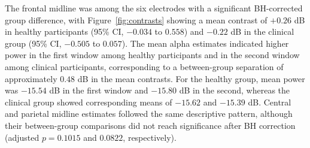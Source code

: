 \documentclass[11pt,letterpaper]{article}
\begin{document}
The frontal midline was among the six electrodes with a significant BH-corrected group difference, with Figure~\ref{fig:contrasts} showing a mean contrast of \(+0.26\) dB in healthy participants (95\% CI, \(-0.034\) to \(0.558\)) and \(-0.22\) dB in the clinical group (95\% CI, \(-0.505\) to \(0.057\)). The mean alpha estimates indicated higher power in the first window among healthy participants and in the second window among clinical participants, corresponding to a between-group separation of approximately \(0.48\) dB in the mean contrasts. For the healthy group, mean power was \(-15.54\) dB in the first window and \(-15.80\) dB in the second, whereas the clinical group showed corresponding means of \(-15.62\) and \(-15.39\) dB. Central and parietal midline estimates followed the same descriptive pattern, although their between-group comparisons did not reach significance after BH correction (adjusted \(p=0.1015\) and \(0.0822\), respectively).
\end{document}
